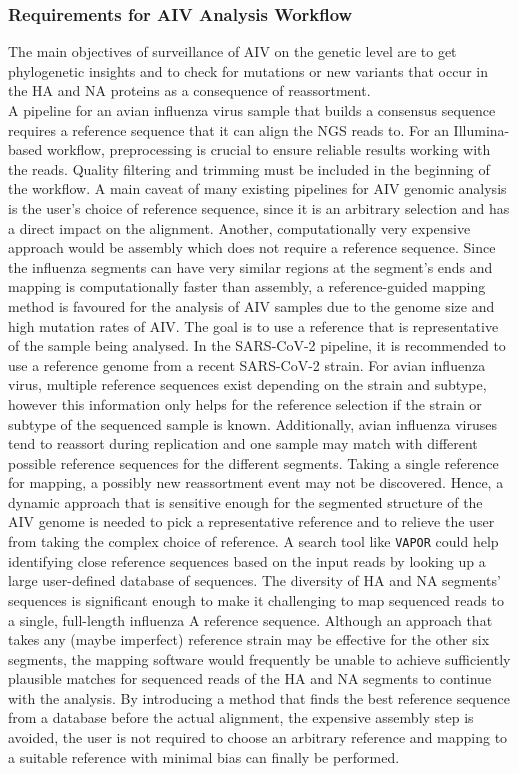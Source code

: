 \subsubsection{Requirements for AIV Analysis Workflow}
The main objectives of surveillance of \ac{AIV} on the genetic level are to get phylogenetic insights and to check for mutations or new variants that occur in the \ac{HA} and \ac{NA} proteins as a consequence of reassortment. \\
A pipeline for an avian influenza virus sample that builds a consensus sequence requires a reference sequence that it can align the NGS reads to. For an Illumina-based workflow, preprocessing is crucial to ensure reliable results working with the reads. Quality filtering and trimming must be included in the beginning of the workflow. A main caveat of many existing pipelines for \ac{AIV} genomic analysis is the user's choice of reference sequence, since it is an arbitrary selection and has a direct impact on the alignment. Another, computationally very expensive approach would be assembly which does not require a reference sequence. Since the influenza segments can have very similar regions at the segment's ends and mapping is computationally faster than assembly, a reference-guided mapping method is favoured for the analysis of \ac{AIV} samples due to the genome size and high mutation rates of \ac{AIV}. The goal is to use a reference that is representative of the sample being analysed. In the \ac{SARS-CoV-2} pipeline, it is recommended to use a reference genome from a recent \ac{SARS-CoV-2} strain. For avian influenza virus, multiple reference sequences exist depending on the strain and subtype, however this information only helps for the reference selection if the strain or subtype of the sequenced sample is known. Additionally, avian influenza viruses tend to reassort during replication and one sample may match with different possible reference sequences for the different segments. Taking a single reference for mapping, a possibly new reassortment event may not be discovered. Hence, a dynamic approach that is sensitive enough for the segmented structure of the \ac{AIV} genome is needed to pick a representative reference and to relieve the user from taking the complex choice of reference. A search tool like \texttt{VAPOR} could help identifying close reference sequences based on the input reads by looking up a large user-defined database of sequences. The diversity of \ac{HA} and \ac{NA} segments' sequences is significant enough to make it challenging to map sequenced reads to a single, full-length influenza A reference sequence. Although an approach that takes any (maybe imperfect) reference strain may be effective for the other six segments, the mapping software would frequently be unable to achieve sufficiently plausible matches for sequenced reads of the \ac{HA} and \ac{NA} segments to continue with the analysis. By introducing a method that finds the best reference sequence from a database before the actual alignment, the expensive assembly step is avoided, the user is not required to choose an arbitrary reference and mapping to a suitable reference with minimal bias can finally be performed. \\
